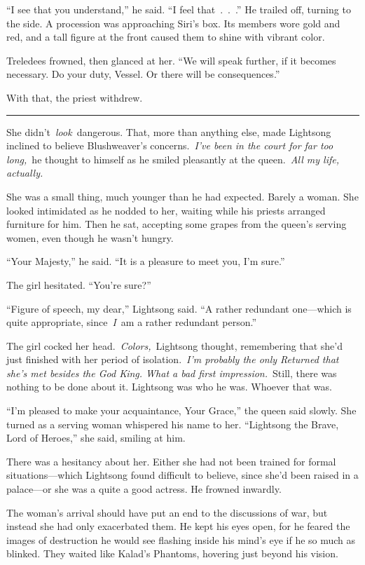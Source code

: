 “I see that you understand,” he said. “I feel that~.~.~.” He trailed off, turning to the side. A procession was approaching Siri’s box. Its members wore gold and red, and a tall figure at the front caused them to shine with vibrant color.

Treledees frowned, then glanced at her. “We will speak further, if it becomes necessary. Do your duty, Vessel. Or there will be consequences.”

With that, the priest withdrew.

\bigskip \hrule \bigskip

She didn’t~\textit{look}~dangerous. That, more than anything else, made Lightsong inclined to believe Blushweaver’s concerns.~\textit{I’ve been in the court for far too long,}~he thought to himself as he smiled pleasantly at the queen.~\textit{All my life, actually.}

She was a small thing, much younger than he had expected. Barely a woman. She looked intimidated as he nodded to her, waiting while his priests arranged furniture for him. Then he sat, accepting some grapes from the queen’s serving women, even though he wasn’t hungry.

“Your Majesty,” he said. “It is a pleasure to meet you, I’m sure.”

The girl hesitated. “You’re sure?”

“Figure of speech, my dear,” Lightsong said. “A rather redundant one—which is quite appropriate, since~\textit{I}~am a rather redundant person.”

The girl cocked her head.~\textit{Colors,}~Lightsong thought, remembering that she’d just finished with her period of isolation.~\textit{I’m probably the only Returned that she’s met besides the God King. What a bad first impression.}~Still, there was nothing to be done about it. Lightsong was who he was. Whoever that was.

“I’m pleased to make your acquaintance, Your Grace,” the queen said slowly. She turned as a serving woman whispered his name to her. “Lightsong the Brave, Lord of Heroes,” she said, smiling at him.

There was a hesitancy about her. Either she had not been trained for formal situations—which Lightsong found difficult to believe, since she’d been raised in a palace—or she was a quite a good actress. He frowned inwardly.

The woman’s arrival should have put an end to the discussions of war, but instead she had only exacerbated them. He kept his eyes open, for he feared the images of destruction he would see flashing inside his mind’s eye if he so much as blinked. They waited like Kalad’s Phantoms, hovering just beyond his vision.

